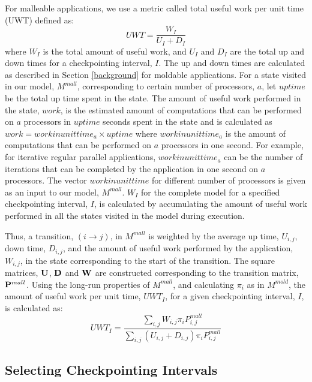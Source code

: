 \documentclass[conference,10pt]{IEEEtran}
\begin{document}
For malleable applications, we use a metric called total useful
work per unit time (UWT) defined as:
\begin{equation}
UWT = \frac{W_I}{U_I+D_I}
\end{equation}
where $W_I$ is the total amount of useful work, and $U_I$ and $D_I$
are the total up and down times for a checkpointing interval, $I$. The
up and down times are calculated as described in Section
\ref{background} for moldable applications. For a state visited in our
model, $M^{mall}$, corresponding to certain number of processors, $a$,
let $uptime$ be the total up time spent in the state. The amount of
useful work performed in the state, $work$,  is the estimated amount
of computations that can be performed on $a$ processors in $uptime$
seconds spent in the state and is calculated as
$work=workinunittime_a\times uptime$ where $workinunittime_a$ is the
amount of computations that can be performed on $a$ processors in one
second. For example, for iterative regular parallel applications,
$workinunittime_a$ can be the number of iterations that can be
completed by the application in one second on $a$ processors. The
vector $workinunittime$ for different number of processors is given as
an input to our model, $M^{mall}$. $W_I$ for the complete model for a
specified checkpointing interval, $I$, is calculated by accumulating
the amount of useful work performed in all the states visited in the
model during execution.

Thus, a transition, $(i\to j)$, in $M^{mall}$ is weighted by the
average up time, $U_{i,j}$, down time, $D_{i,j}$, and the amount of
useful work performed by the application, $W_{i,j}$, in the state
corresponding to the start of the transition. The square matrices,
${\bf U}$, ${\bf D}$ and ${\bf W}$ are constructed corresponding to
the transition matrix, ${\bf P}^{mall}$. Using the long-run properties
of $M^{mall}$, and calculating $\pi_i$ as in $M^{mold}$, the amount of
useful work per unit time, $UWT_I$, for a given checkpointing
interval, $I$, is calculated as:
\begin{equation}
UWT_I =
\frac{\sum_{i,j}W_{i,j}\pi_i P^{mall}_{i,j}}{\sum_{i,j}(U_{i,j}+D_{i,j})\pi_i
  P^{mall}_{i,j}}
\end{equation}

\subsection{Selecting Checkpointing Intervals}
\label{selectingI}
\end{document}
